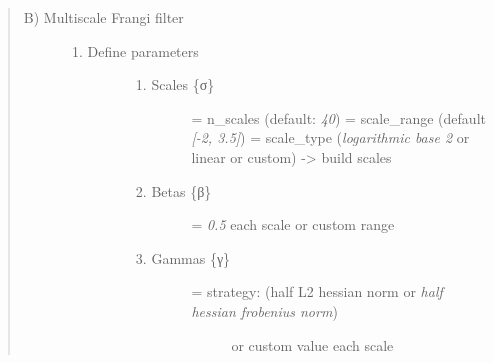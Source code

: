 \begin{quote}
\begin{description}
\item[B) Multiscale Frangi filter]
\begin{enumerate}
\def\labelenumi{\arabic{enumi})}
\item
  \begin{description}
  \item[Define parameters]
  \begin{enumerate}
  \def\labelenumii{\alph{enumii})}
  \item
    \begin{description}
    \item[Scales \{σ\}]
    = n\_scales (default: \emph{40}) = scale\_range (default
    \emph{{[}-2, 3.5{]}}) = scale\_type (\emph{logarithmic base 2} or
    linear or custom) -\textgreater{} build scales
    \end{description}
  \item
    \begin{description}
    \item[Betas \{β\}]
    = \emph{0.5} each scale or custom range
    \end{description}
  \item
    \begin{description}
    \item[Gammas \{γ\}]
    \begin{description}
    \item[= strategy: (half L2 hessian norm or \emph{half hessian
    frobenius norm})]
    or custom value each scale
    \end{description}


\end{description}
\end{enumerate}
\end{description}
\end{enumerate}
\end{description}
\end{quote}
